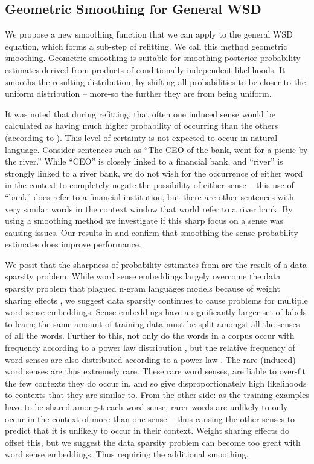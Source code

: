\documentclass{sig-alternate}
\begin{document}
\subsection{Geometric Smoothing for General WSD} \label{smoothing}
We propose a new smoothing function that we can apply to the general WSD equation, which forms a sub-step of refitting.
We call this method geometric smoothing.
Geometric smoothing is suitable for smoothing posterior probability estimates derived from products of conditionally independent likelihoods.
It smooths the resulting distribution, by shifting all probabilities to be closer to the uniform distribution -- more-so the further they are from being uniform.

It was noted that during refitting, that often one induced sense would be calculated as having much higher probability of occurring than the others (according to ). This level of certainty is not expected to occur in natural language. Consider sentences such as \enquote{The CEO of the bank, went for a picnic by the river.} While \enquote{CEO} is closely linked to a financial bank, and \enquote{river} is strongly linked to a river bank, we do not wish for the occurrence of either word in the context to completely negate the possibility of either sense -- this use of \enquote{bank} does refer to a financial institution, but there are other sentences with very similar words in the context window that world refer to a river bank.
By using a smoothing method we investigate if this sharp focus on a sense was causing issues.
Our results in  and  confirm that smoothing the sense probability estimates does improve performance.

We posit that the sharpness of probability estimates from  are the result of a data sparsity problem. While word sense embeddings largely overcome the data sparsity problem that plagued n-gram languages models because of weight sharing effects \parencite{NPLM}, we suggest data sparsity continues to cause problems for multiple word sense embeddings. Sense embeddings have a significantly larger set of labels to learn; the same amount of training data must be split amongst all the senses of all the words. Further to this, not only do the words in a corpus occur with frequency according to a power law distribution \parencite{zipf1949human},  but the relative frequency of word senses are also distributed according to a power law \parencite{Kilgarriff2004}. The rare (induced) word senses are thus extremely rare. These rare word senses, are liable to over-fit the few contexts they do occur in, and so give disproportionately high likelihoods to contexts that they are similar to. From the other side: as the training examples have to be shared amongst each word sense, rarer words are unlikely to only occur in the context of more than one sense -- thus causing the other senses to predict that it is unlikely to occur in their context. Weight sharing effects do offset this, but we suggest the data sparsity problem can become too great with word sense embeddings. Thus requiring the additional smoothing.
\end{document}
